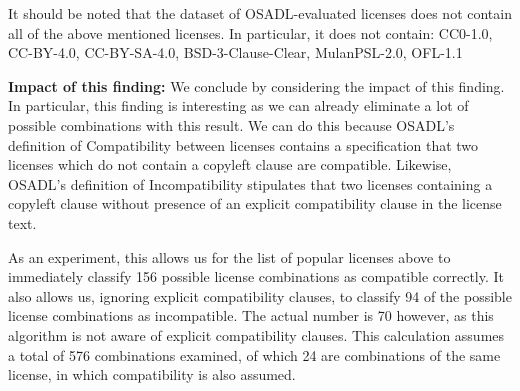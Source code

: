 It should be noted that the dataset of OSADL-evaluated licenses does not contain all of the above mentioned licenses. In particular, it does not contain: CC0-1.0, CC-BY-4.0, CC-BY-SA-4.0, BSD-3-Clause-Clear, MulanPSL-2.0, OFL-1.1

\textbf{Impact of this finding:} We conclude by considering the impact of this finding. In particular, this finding is interesting as we can already eliminate a lot of possible combinations with this result. We can do this because OSADL's definition of Compatibility between licenses contains a specification that two licenses which do not contain a copyleft clause are compatible. Likewise, OSADL's definition of Incompatibility stipulates that two licenses containing a copyleft clause without presence of an explicit compatibility clause in the license text.

As an experiment, this allows us for the list of popular licenses above to immediately classify 156 possible license combinations as compatible correctly. It also allows us, ignoring explicit compatibility clauses, to classify 94 of the possible license combinations as incompatible. The actual number is 70 however, as this algorithm is not aware of explicit compatibility clauses. This calculation assumes a total of 576 combinations examined, of which 24 are combinations of the same license, in which compatibility is also assumed.


